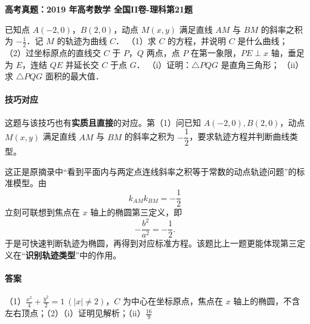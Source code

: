 \documentclass[UTF8,a4paper,11pt]{ctexart}
\newenvironment{gaokao}[1]{\par\medskip\noindent\textbf{高考真题：#1}\par\smallskip}{\par\medskip}
\begin{document}
\begin{gaokao}{2019 年高考数学 全国II卷-理科第21题}

已知点 $A(-2,0)$，$B(2,0)$，动点 $M(x,y)$ 满足直线 $AM$ 与 $BM$ 的斜率之积为 $-\frac{1}{2}$．记 $M$ 的轨迹为曲线 $C$．
（1）求 $C$ 的方程，并说明 $C$ 是什么曲线；
（2）过坐标原点的直线交 $C$ 于 $P$，$Q$ 两点，点 $P$ 在第一象限，$PE\perp x$ 轴，垂足为 $E$，连结 $QE$ 并延长交 $C$ 于点 $G$．
     （i）证明：$\triangle PQG$ 是直角三角形；
     （ii）求 $\triangle PQG$ 面积的最大值．

\begin{center}


\end{center}

\paragraph{技巧对应}

这题与该技巧也有\textbf{实质且直接}的对应。第（1）问已知 $A(-2,0),B(2,0)$，动点 $M(x,y)$ 满足直线 $AM$ 与 $BM$ 的斜率之积为 $-\dfrac12$，要求轨迹方程并判断曲线类型。

这正是原摘录中“看到平面内与两定点连线斜率之积等于常数的动点轨迹问题”的标准模型。由
\[
k_{AM}k_{BM}=-\frac12
\]
立刻可联想到焦点在 $x$ 轴上的椭圆第三定义，即
\[
-\frac{b^2}{a^2}=-\frac12.
\]
于是可快速判断轨迹为椭圆，再得到对应标准方程。该题比上一题更能体现第三定义在“\textbf{识别轨迹类型}”中的作用。

\paragraph{答案}

（1）$\frac{x^2}{4}+\frac{y^2}{2}=1\ (|x|\neq 2)$，$C$ 为中心在坐标原点，焦点在 $x$ 轴上的椭圆，不含左右顶点；（2）（i）证明见解析；（ii）$\frac{16}{9}$


\end{gaokao}
\end{document}
